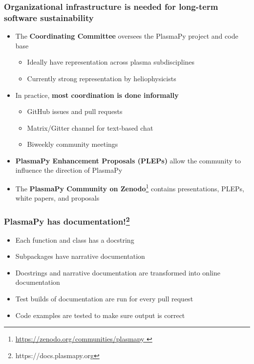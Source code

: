 \documentclass[default,compress]{beamer}
\begin{document}
\begin{frame}[plain]
    \frametitle{Organizational infrastructure is needed for long-term software sustainability}
    \begin{itemize}
    \item The \textbf{Coordinating Committee} oversees the PlasmaPy project and code base
        \begin{itemize}
        \item Ideally have representation across plasma subdisciplines
        \item Currently strong representation by heliophysicists
        \end{itemize}
    \item In practice, \textbf{most coordination is done informally}
        \begin{itemize}
        \item GitHub issues and pull requests
        \item Matrix/Gitter channel for text-based chat
        \item Biweekly community meetings
        \end{itemize}
    \item \textbf{PlasmaPy Enhancement Proposals (PLEPs)} allow the community to influence the direction of PlasmaPy
    \item The \textbf{PlasmaPy Community on Zenodo}\footnote{
    \href{
        https://zenodo.org/communities/plasmapy
        }{
        https://zenodo.org/communities/plasmapy
        }
    } contains presentations, PLEPs, white papers, and proposals
    \end{itemize}
\end{frame}


\begin{frame}[plain]
    \frametitle{PlasmaPy has documentation!\footnote{https://docs.plasmapy.org}}
    \begin{itemize}
    \item Each function and class has a docstring
    \item Subpackages have narrative documentation
    \item Docstrings and narrative documentation are transformed into online documentation
    \item Test builds of documentation are run for every pull request
    \item Code examples are tested to make sure output is correct
    \end{itemize}
\end{frame}
\end{document}

